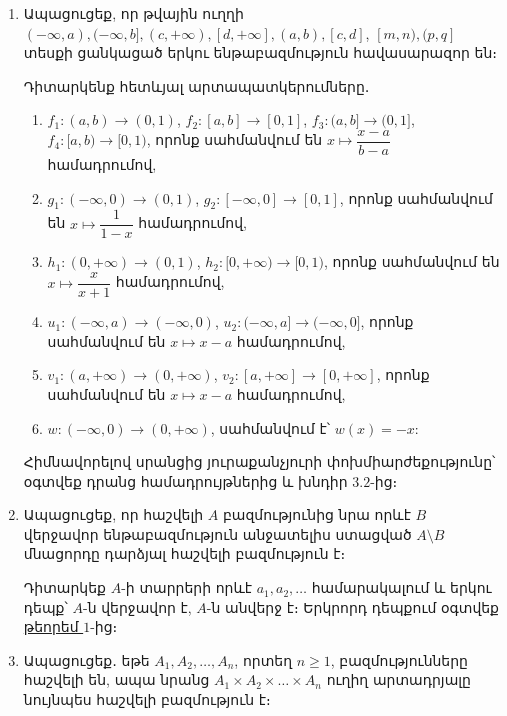 \begin{enumerate}[label=\thesection.\arabic*.]
\item Ապացուցեք, որ թվային ուղղի $(-\infty, a), (-\infty,b], (c, +\infty), [d, +\infty], (a,b), [c,d]$, $[m,n), (p,q]$ տեսքի ցանկացած երկու ենթաբազմություն հավասարազոր են։

\begin{hint}
    Դիտարկենք հետևյալ արտապատկերումները․
\begin{enumerate}
    \item[ա)] $f_1 : (a, b) \rightarrow (0, 1)$, $f_2 : [a, b] \rightarrow [0, 1]$, $f_3 : (a, b] \rightarrow (0, 1]$, $f_4 : [a, b) \rightarrow [0, 1)$, որոնք սահմանվում են $x \mapsto \dfrac{x-a}{b-a}$ համադրումով,
    \item[բ)]  $g_1 : (-\infty, 0) \rightarrow (0, 1)$, $g_2 : [-\infty, 0] \rightarrow [0, 1]$, որոնք սահմանվում են $x \mapsto \dfrac{1}{1-x}$ համադրումով,
    \item[գ)]  $h_1 : (0, + \infty) \rightarrow  (0, 1)$, $h_2 : [0, +\infty) \rightarrow  [0,1)$, որոնք սահմանվում են $x \mapsto \dfrac{x}{x+1}$ համա\-դրումով,
    \item[դ)]  $u_1 : (- \infty, a) \rightarrow (- \infty, 0 )$, $u_2 : (-\infty, a] \rightarrow (-\infty, 0]$, որոնք սահմանվում են $x \mapsto x-a $ համադրումով,
    \item[ե)] $v_1 : (a, +\infty) \rightarrow (0, +\infty)$, $v_2 : [a, +\infty] \rightarrow [0,+\infty]$, որոնք սահմանվում են $x \mapsto x-a $ համադրումով,
    \item[զ)] $w : (-\infty, 0) \rightarrow (0, +\infty)$, սահմանվում է՝ $w(x) = -x$: 

\end{enumerate}

Հիմնավորելով սրանցից յուրաքանչյուրի փոխմիարժեքությունը՝ օգտվեք \linebreak դրանց համադրույթներից և խնդիր $3.2$-ից։
\end{hint}

\item Ապացուցեք, որ հաշվելի $A$ բազմությունից նրա որևէ $B$ վերջավոր ենթաբազ\-մություն անջատելիս ստացված $A\setminus B$ մնացորդը դարձյալ հաշվելի բազմու\-թյուն է։

\begin{hint}
     Դիտարկեք $A$-ի տարրերի որևէ ${a_1, a_2, \dots}$ համարակալում և երկու դեպք՝ $A$-ն վերջավոր է, $A$-ն անվերջ է։ Երկրորդ դեպքում օգտվեք \hyperref[ch3thm2]{թեորեմ $1$}-ից։ 
\end{hint}

\item Ապացուցեք․ եթե $A_1, A_2, \dots, A_n$, որտեղ $n \geq 1$, բազմությունները հաշվելի են, ապա նրանց $A_1 \times A_2 \times \dots \times A_n$ ուղիղ արտադրյալը նույնպես հաշվելի բազմություն է։


\end{enumerate}
